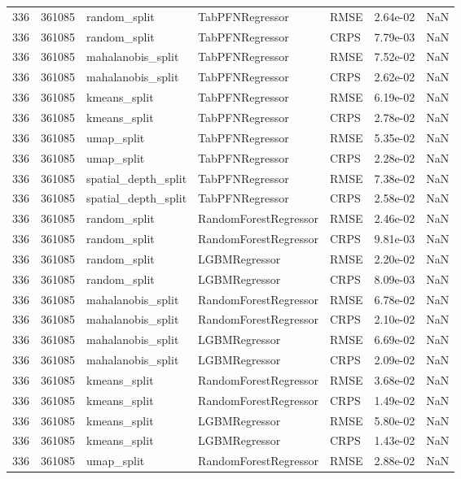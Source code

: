 \begin{tabular}{rrlllrr}
336 & 361085 & random\_split & TabPFNRegressor & RMSE & 2.64e-02 & NaN \\
336 & 361085 & random\_split & TabPFNRegressor & CRPS & 7.79e-03 & NaN \\
336 & 361085 & mahalanobis\_split & TabPFNRegressor & RMSE & 7.52e-02 & NaN \\
336 & 361085 & mahalanobis\_split & TabPFNRegressor & CRPS & 2.62e-02 & NaN \\
336 & 361085 & kmeans\_split & TabPFNRegressor & RMSE & 6.19e-02 & NaN \\
336 & 361085 & kmeans\_split & TabPFNRegressor & CRPS & 2.78e-02 & NaN \\
336 & 361085 & umap\_split & TabPFNRegressor & RMSE & 5.35e-02 & NaN \\
336 & 361085 & umap\_split & TabPFNRegressor & CRPS & 2.28e-02 & NaN \\
336 & 361085 & spatial\_depth\_split & TabPFNRegressor & RMSE & 7.38e-02 & NaN \\
336 & 361085 & spatial\_depth\_split & TabPFNRegressor & CRPS & 2.58e-02 & NaN \\
336 & 361085 & random\_split & RandomForestRegressor & RMSE & 2.46e-02 & NaN \\
336 & 361085 & random\_split & RandomForestRegressor & CRPS & 9.81e-03 & NaN \\
336 & 361085 & random\_split & LGBMRegressor & RMSE & 2.20e-02 & NaN \\
336 & 361085 & random\_split & LGBMRegressor & CRPS & 8.09e-03 & NaN \\
336 & 361085 & mahalanobis\_split & RandomForestRegressor & RMSE & 6.78e-02 & NaN \\
336 & 361085 & mahalanobis\_split & RandomForestRegressor & CRPS & 2.10e-02 & NaN \\
336 & 361085 & mahalanobis\_split & LGBMRegressor & RMSE & 6.69e-02 & NaN \\
336 & 361085 & mahalanobis\_split & LGBMRegressor & CRPS & 2.09e-02 & NaN \\
336 & 361085 & kmeans\_split & RandomForestRegressor & RMSE & 3.68e-02 & NaN \\
336 & 361085 & kmeans\_split & RandomForestRegressor & CRPS & 1.49e-02 & NaN \\
336 & 361085 & kmeans\_split & LGBMRegressor & RMSE & 5.80e-02 & NaN \\
336 & 361085 & kmeans\_split & LGBMRegressor & CRPS & 1.43e-02 & NaN \\
336 & 361085 & umap\_split & RandomForestRegressor & RMSE & 2.88e-02 & NaN \\

\end{tabular}

